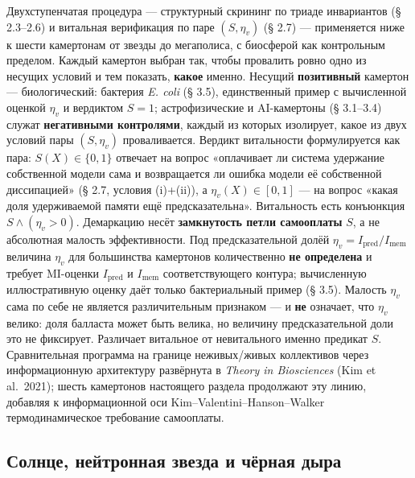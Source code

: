 \documentclass[pdflatex,sn-mathphys-ay]{sn-jnl}
\begin{document}
Двухступенчатая процедура --- структурный скрининг по триаде инвариантов (§ 2.3--2.6) и витальная верификация по паре \((S, \eta_v)\) (§ 2.7) --- применяется ниже к шести камертонам от звезды до мегаполиса, с биосферой как контрольным пределом. Каждый камертон выбран так, чтобы провалить ровно одно из несущих условий и тем показать, \textbf{какое} именно. Несущий \textbf{позитивный} камертон --- биологический: бактерия \emph{E. coli} (§ 3.5), единственный пример с вычисленной оценкой \(\eta_v\) и вердиктом \(S = 1\); астрофизические и AI-камертоны (§ 3.1--3.4) служат \textbf{негативными контролями}, каждый из которых изолирует, какое из двух условий пары \((S, \eta_v)\) проваливается. Вердикт витальности формулируется как пара: \(S(X) \in \{0, 1\}\) отвечает на вопрос «оплачивает ли система удержание собственной модели сама и возвращается ли ошибка модели её собственной диссипацией» (§ 2.7, условия (i)+(ii)), а \(\eta_v(X) \in [0, 1]\) --- на вопрос «какая доля удерживаемой памяти ещё предсказательна». Витальность есть конъюнкция \(S \wedge (\eta_v > 0)\). Демаркацию несёт \textbf{замкнутость петли самооплаты} \(S\), а не абсолютная малость эффективности. Под предсказательной долёй \(\eta_v = I_{\text{pred}}/I_{\text{mem}}\) величина \(\eta_v\) для большинства камертонов количественно \textbf{не определена} и требует MI-оценки \(I_{\text{pred}}\) и \(I_{\text{mem}}\) соответствующего контура; вычисленную иллюстративную оценку даёт только бактериальный пример (§ 3.5). Малость \(\eta_v\) сама по себе не является различительным признаком --- и \textbf{не} означает, что \(\eta_v\) велико: доля балласта может быть велика, но величину предсказательной доли это не фиксирует. Различает витальное от невитального именно предикат \(S\). Сравнительная программа на границе неживых/живых коллективов через информационную архитектуру развёрнута в \emph{Theory in Biosciences} (Kim et al.~2021); шесть камертонов настоящего раздела продолжают эту линию, добавляя к информационной оси Kim--Valentini--Hanson--Walker термодинамическое требование самооплаты.

\subsection{Солнце, нейтронная звезда и чёрная дыра}\label{ux441ux43eux43bux43dux446ux435-ux43dux435ux439ux442ux440ux43eux43dux43dux430ux44f-ux437ux432ux435ux437ux434ux430-ux438-ux447ux451ux440ux43dux430ux44f-ux434ux44bux440ux430}
\end{document}
